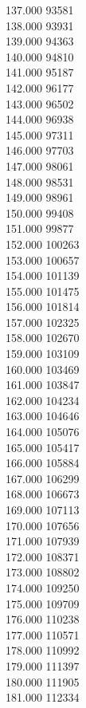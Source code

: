 { 137.000	93581 \\
 138.000	93931 \\
 139.000	94363 \\
 140.000	94810 \\
 141.000	95187 \\
 142.000	96177 \\
 143.000	96502 \\
 144.000	96938 \\
 145.000	97311 \\
 146.000	97703 \\
 147.000	98061 \\
 148.000	98531 \\
 149.000	98961 \\
 150.000	99408 \\
 151.000	99877 \\
 152.000	100263 \\
 153.000	100657 \\
 154.000	101139 \\
 155.000	101475 \\
 156.000	101814 \\
 157.000	102325 \\
 158.000	102670 \\
 159.000	103109 \\
 160.000	103469 \\
 161.000	103847 \\
 162.000	104234 \\
 163.000	104646 \\
 164.000	105076 \\
 165.000	105417 \\
 166.000	105884 \\
 167.000	106299 \\
 168.000	106673 \\
 169.000	107113 \\
 170.000	107656 \\
 171.000	107939 \\
 172.000	108371 \\
 173.000	108802 \\
 174.000	109250 \\
 175.000	109709 \\
 176.000	110238 \\
 177.000	110571 \\
 178.000	110992 \\
 179.000	111397 \\
 180.000	111905 \\
 181.000	112334 \\
}
